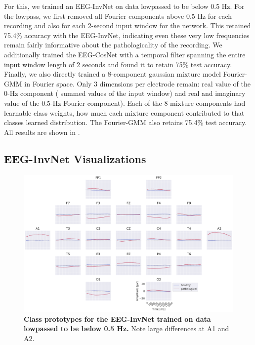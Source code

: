     For this, we trained an EEG-InvNet on data lowpassed to be below 0.5 Hz.
For the lowpass, we first removed all Fourier components above 0.5 Hz
for each recording and also for each 2-second input window for the
network. This retained 75.4\% accuracy with the EEG-InvNet, indicating
even these very low frequencies remain fairly informative about the
pathologicality of the recording. We additionally trained the EEG-CosNet
with a temporal filter spanning the entire input window length of 2
seconds and found it to retain 75\% test accuracy. Finally, we also
directly trained a 8-component gaussian mixture model Fourier-GMM in
Fourier space. Only 3 dimensions per electrode remain: real value of the
0-Hz component ( summed values of the input window) and real and
imaginary value of the 0.5-Hz Fourier component). Each of the 8 mixture
components had learnable class weights, how much each mixture component
contributed to that classes learned distribution. The Fourier-GMM also
retains 75.4\% test accuracy. All results are shown in
.

\subsection{EEG-InvNet
Visualizations}\label{eeg-invnet-visualizations}

\begin{figure}[htb]
    \myfloatalign
    \includegraphics[width=1\linewidth]{images/net-lowfreq-prototypes.png}
    \caption[EEG-InvNet low-frequency class prototypes]{
\textbf{Class prototypes for the EEG-InvNet trained on data lowpassed to
be below 0.5 Hz.} Note large differences at A1 and A2.
}
\label{net-low-freq-prototypes-fig}
\end{figure}


